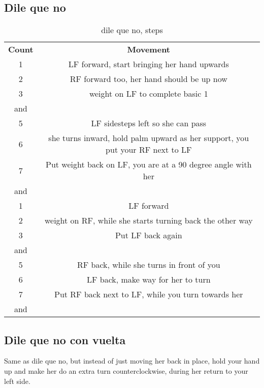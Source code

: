 \subsection{Dile que no}
\begin{table}[H]
\centering
\begin{tabular}{cc}
  \toprule
  \textbf{Count} & \textbf{Movement}\\
  \cmidrule(lr){1-1}\cmidrule(lr){2-2}
  1 & LF forward, start bringing her hand upwards\\
  2 & RF forward too, her hand should be up now\\
  3 & weight on LF to complete basic 1\\
  and & \\
  5 & LF sidesteps left so she can pass\\
  6 & she turns inward, hold palm upward as her support, you put your RF next to LF\\
  7 & Put weight back on LF, you are at a 90 degree angle with her\\
  and & \\
  1 & LF forward\\
  2 & weight on RF, while she starts turning back the other way\\
  3 & Put LF back again\\
  and & \\
  5 & RF back, while she turns in front of you\\
  6 & LF back, make way for her to turn\\
  7 & Put RF back next to LF, while you turn towards her\\
  and & \\
  \bottomrule
\end{tabular}
\label{dileequeno_steps}
\caption{dile que no, steps}
\end{table}

\subsection{Dile que no con vuelta}
Same as dile que no, but instead of just moving her back in place, hold your hand up and make her do an extra turn counterclockwise,
during her return to your left side.

